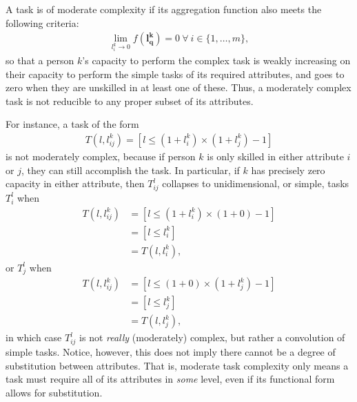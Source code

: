 {\begin{definition}
        \begin{subdefinition}
            A task is of moderate complexity if its aggregation function also meets the following criteria:
            \begin{gather}
                \lim_{
                    l_{i}^{k} \rightarrow 0
                }{
                    f(\boldsymbol{l_{q}^{k}})
                } = 0
                \
                \forall 
                \
                i \in \{1, \dots, m\}
                ,
            \end{gather}
            so that a person $k$'s capacity to perform the complex task is weakly increasing on their capacity to perform the simple tasks of its required attributes, and goes to zero when they are unskilled in at least one of these. Thus, a moderately complex task is not reducible to any proper subset of its attributes.
            
            For instance, a task of the form
        \begin{gather}
            T(l, l_{ij}^{k})
            = [l \leq (1 + l_{i}^{k}) \times (1 + l_{j}^{k}) - 1]
        \end{gather}
        is not moderately complex, because if person $k$ is only skilled in either attribute $i$ or $j$, they can still accomplish the task. In particular, if $k$ has precisely zero capacity in either attribute, then $T_{ij}^{l}$ collapses to unidimensional, or simple, tasks $T_{i}^{l}$ when
        \begin{align}
            T(l, l_{ij}^{k})
            &= [l \leq (1 + l_{i}^{k}) \times (1 + 0) - 1]
            \\
            &= [l \leq l_{i}^{k}]
            \\
            &= T(l, l_{i}^{k})
            ,
        \end{align}
        or $T_{j}^{l}$ when
        \begin{align}
            T(l, l_{ij}^{k})
            &= [l \leq (1 + 0) \times (1 + l_{j}^{k}) - 1]
            \\
            &= [l \leq l_{j}^{k}]
            \\
            &= T(l, l_{j}^{k})
            ,
        \end{align}
        in which case $T_{ij}^{l}$ is not \textit{really} (moderately) complex, but rather a convolution of simple tasks. Notice, however, this does not imply there cannot be a degree of substitution between attributes. That is, moderate task complexity only means a task must require all of its attributes in \textit{some} level, even if its functional form allows for substitution.
        

\end{subdefinition}
\end{definition}}
